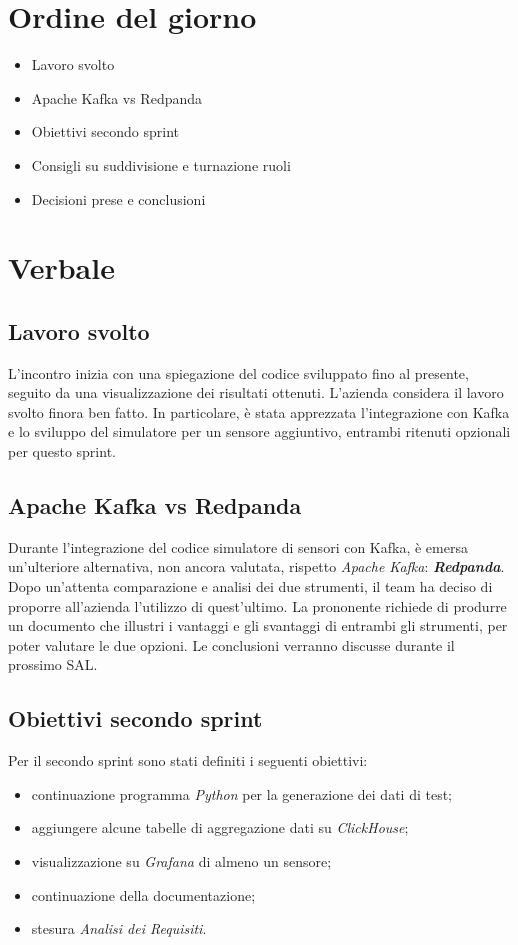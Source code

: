 \documentclass[italian,12pt]{article}
\begin{document}
\section{Ordine del giorno}
\begin{itemize}
	\item Lavoro svolto
	\item Apache Kafka vs Redpanda
	\item Obiettivi secondo sprint
	\item Consigli su suddivisione e turnazione ruoli
	\item Decisioni prese e conclusioni
\end{itemize}
\newpage
\section{Verbale}
\subsection{Lavoro svolto}
L'incontro inizia con una spiegazione del codice sviluppato fino al presente, seguito da una visualizzazione dei risultati ottenuti.
L'azienda considera il lavoro svolto finora ben fatto. In particolare, è stata apprezzata l'integrazione con Kafka e lo sviluppo del simulatore per un sensore aggiuntivo, entrambi ritenuti opzionali per questo sprint.
\subsection{Apache Kafka vs Redpanda}
Durante l'integrazione del codice simulatore di sensori con Kafka, è emersa un'ulteriore alternativa, non ancora valutata, rispetto \textit{Apache Kafka}: \textbf{\textit{Redpanda}}. Dopo un'attenta comparazione e analisi dei due strumenti, il team ha deciso di proporre all'azienda l'utilizzo di quest'ultimo. La prononente richiede di produrre un documento che illustri i vantaggi e gli svantaggi di entrambi gli strumenti, per poter valutare le due opzioni. Le conclusioni verranno discusse durante il prossimo SAL. 
\subsection{Obiettivi secondo sprint}
Per il secondo sprint sono stati definiti i seguenti obiettivi:
\begin{itemize}
	\item continuazione programma \textit{Python} per la generazione dei dati di test;
	\item aggiungere alcune tabelle di aggregazione dati su \textit{ClickHouse};
	\item visualizzazione su \textit{Grafana} di almeno un sensore;
	\item continuazione della documentazione;
	\item stesura \textit{Analisi dei Requisiti}.
\end{itemize}
\newpage
\end{document}
